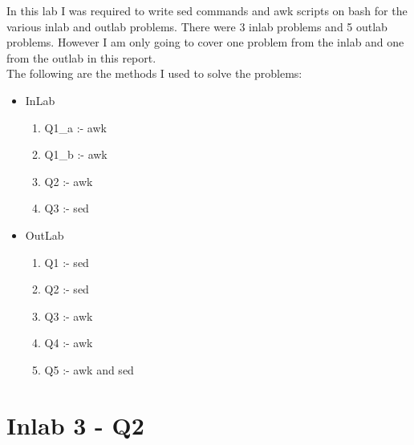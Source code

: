\documentclass[12pt]{article}
\begin{document}
\vspace*{1em}
In this lab I was required to write sed commands and awk scripts on bash for the 
various inlab and outlab problems. There were 3 inlab problems and 5 outlab problems.
However I am only going to cover one problem from the inlab and one from the outlab 
in this report.\\
The following are the methods I used to solve the problems:\\
\begin{itemize}
    \item InLab
    \begin{enumerate}
        \item Q1\_a :- awk
        \item Q1\_b :- awk
        \item Q2    :- awk
        \item Q3    :- sed
    \end{enumerate}
    \item OutLab
    \begin{enumerate}
        \item Q1 :- sed
        \item Q2 :- sed
        \item Q3 :- awk
        \item Q4 :- awk
        \item Q5 :- awk and sed
    \end{enumerate}
\end{itemize}

\newpage

\section{Inlab 3 - Q2}
\end{document}
